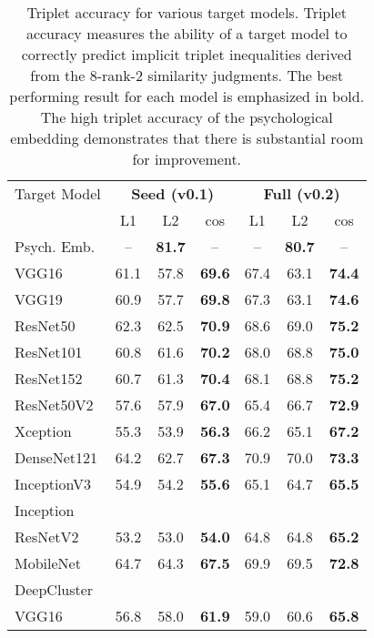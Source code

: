 \begin{table}
\begin{center}
\begin{tabular}{|l|c|c|c|c|c|c|}
\hline
Target Model & \multicolumn{3}{|c|}{\bf{Seed (v0.1)}} & \multicolumn{3}{|c|}{\bf{Full (v0.2)}} \\
  & L1 & L2 & cos & L1 & L2 & cos \\
\hline\hline
Psych. Emb. & -- & \bf{81.7} & -- & -- & \bf{80.7} & -- \\
VGG16 & 61.1 & 57.8 & \bf{69.6} & 67.4 & 63.1 & \bf{74.4} \\
VGG19 & 60.9 & 57.7 & \bf{69.8} & 67.3 & 63.1 & \bf{74.6} \\
ResNet50 & 62.3 & 62.5 & \bf{70.9} & 68.6 & 69.0 & \bf{75.2} \\
ResNet101 & 60.8 & 61.6 & \bf{70.2} & 68.0 & 68.8 & \bf{75.0} \\
ResNet152 & 60.7 & 61.3 & \bf{70.4} & 68.1 & 68.8 & \bf{75.2} \\
ResNet50V2 & 57.6 & 57.9 & \bf{67.0} & 65.4 & 66.7 & \bf{72.9} \\
Xception & 55.3 & 53.9 & \bf{56.3} & 66.2 & 65.1 & \bf{67.2} \\
DenseNet121 & 64.2 & 62.7 & \bf{67.3} & 70.9 & 70.0 & \bf{73.3} \\
InceptionV3 & 54.9 & 54.2 & \bf{55.6} & 65.1 & 64.7 & \bf{65.5} \\
Inception & & & & & & \\
\hspace{3mm}ResNetV2 & 53.2 & 53.0 & \bf{54.0} & 64.8 & 64.8 & \bf{65.2} \\
MobileNet & 64.7 & 64.3 & \bf{67.5} & 69.9 & 69.5 & \bf{72.8} \\
DeepCluster & & & & & & \\
\hspace{3mm}VGG16 & 56.8 & 58.0 & \bf{61.9} & 59.0 & 60.6 & \bf{65.8} \\
\hline
\end{tabular}
\end{center}
\caption{Triplet accuracy for various target models. Triplet accuracy measures the ability of a target model to correctly predict implicit triplet inequalities derived from the 8-rank-2 similarity judgments. The best performing result for each model is emphasized in bold. The high triplet accuracy of the psychological embedding demonstrates that there is substantial room for improvement.}
\end{table}
